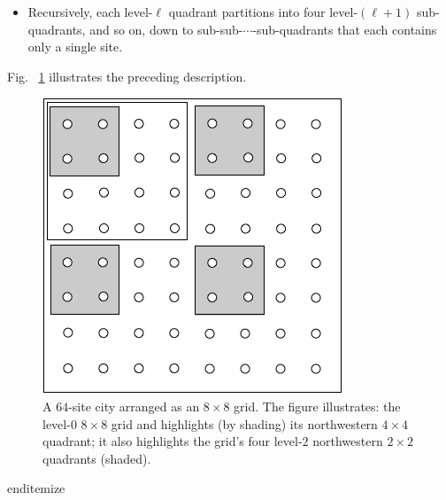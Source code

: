\begin{enumerate}
{\begin{itemize}
\begin{itemize}
  \medskip\item
Recursively, each level-$\ell$ quadrant partitions into four level-$(\ell +1)$ sub-quadrants, and so on, down to sub-sub-$\cdots$-sub-quadrants that each contains only a single site.  
    \end{itemize}
Fig.~ \ref{fig:routingCity} illustrates the preceding description.
\begin{figure}[hbt]
\begin{center}
       \includegraphics[scale=0.35]{FiguresGraph/routingCity}
\caption{A $64$-site city arranged as an $8 \times 8$ grid.  The figure illustrates: the level-$0$ $8 \times 8$ grid and highlights (by shading) its northwestern $4 \times 4$ quadrant; it also highlights the grid's four level-$2$ northwestern $2 \times 2$ quadrants (shaded).}
  \label{fig:routingCity}
\end{center}
\end{figure}
 end{itemize}


\end{itemize}}
\end{enumerate}
